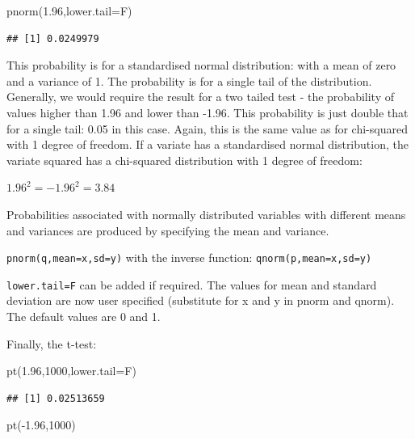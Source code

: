 \documentclass[
]{book}
\newenvironment{Shaded}{\begin{snugshade}}{\end{snugshade}}
\newcommand{\AttributeTok}[1]{\textcolor[rgb]{0.77,0.63,0.00}{#1}}
\newcommand{\DecValTok}[1]{\textcolor[rgb]{0.00,0.00,0.81}{#1}}
\newcommand{\FloatTok}[1]{\textcolor[rgb]{0.00,0.00,0.81}{#1}}
\newcommand{\FunctionTok}[1]{\textcolor[rgb]{0.00,0.00,0.00}{#1}}
\newcommand{\NormalTok}[1]{#1}
\newcommand{\SpecialCharTok}[1]{\textcolor[rgb]{0.00,0.00,0.00}{#1}}
\begin{document}
\begin{Shaded}
\begin{Highlighting}[]
\FunctionTok{pnorm}\NormalTok{(}\FloatTok{1.96}\NormalTok{,}\AttributeTok{lower.tail=}\NormalTok{F)}
\end{Highlighting}
\end{Shaded}

\begin{verbatim}
## [1] 0.0249979
\end{verbatim}

This probability is for a standardised normal distribution: with a mean of zero and a variance of 1. The probability is for a single tail of the distribution. Generally, we would require the result for a two tailed test - the probability of values higher than 1.96 and lower than -1.96. This probability is just double that for a single tail: 0.05 in this case. Again, this is the same value as for chi-squared with 1 degree of freedom. If a variate has a standardised normal distribution, the variate squared has a chi-squared distribution with 1 degree of freedom:

\(1.96^2 = -1.96^2 = 3.84\)

Probabilities associated with normally distributed variables with different means and variances are produced by specifying the mean and variance.

\texttt{pnorm(q,mean=x,sd=y)} with the inverse function: \texttt{qnorm(p,mean=x,sd=y)}

\texttt{lower.tail=F} can be added if required. The values for mean and standard deviation are now user specified (substitute for x and y in pnorm and qnorm). The default values are 0 and 1.

Finally, the t-test:

\begin{Shaded}
\begin{Highlighting}[]
\FunctionTok{pt}\NormalTok{(}\FloatTok{1.96}\NormalTok{,}\DecValTok{1000}\NormalTok{,}\AttributeTok{lower.tail=}\NormalTok{F) }
\end{Highlighting}
\end{Shaded}

\begin{verbatim}
## [1] 0.02513659
\end{verbatim}

\begin{Shaded}
\begin{Highlighting}[]
\FunctionTok{pt}\NormalTok{(}\SpecialCharTok{{-}}\FloatTok{1.96}\NormalTok{,}\DecValTok{1000}\NormalTok{) }
\end{Highlighting}
\end{Shaded}
\end{document}
